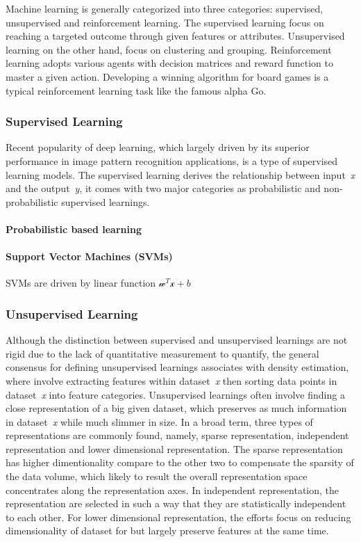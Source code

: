 Machine learning is generally categorized into three categories: supervised, unsupervised and reinforcement learning. The supervised learning focus on reaching a targeted outcome through given features or attributes. Unsupervised learning on the other hand, focus on clustering and grouping. Reinforcement learning adopts various agents with decision matrices and reward function to master a given action. Developing a winning algorithm for board games is a typical reinforcement learning task like the famous alpha Go.
\par

\subsubsection{Supervised Learning}

Recent popularity of deep learning, which largely driven by its superior performance in image pattern recognition applications, is a type of supervised learning models. The supervised learning  derives the relationship between input~\textit{x} and the output~\textit{y}, it comes with two major categories as probabilistic and non-probabilistic supervised learnings. 

\paragraph{Probabilistic based learning}
\paragraph{Support Vector Machines (SVMs)}
SVMs are driven by linear function $\mathcal{w}^T\mathcal{x}+b$ 

\subsubsection{Unsupervised Learning}
Although the distinction between supervised and unsupervised learnings are not rigid due to the lack of quantitative measurement to quantify, the general consensus for defining unsupervised learnings associates with density estimation, where involve extracting features within dataset~\textit{x} then sorting data points in dataset~\textit{x} into feature categories.
Unsupervised learnings often involve finding a close representation of a big given  dataset, which preserves as much information in dataset~\textit{x} while much slimmer in size. In a broad term, three types of representations are commonly found, namely, sparse representation, independent representation and lower dimensional representation. The sparse representation~\cite{Barlow_1989,Olshausen_1996,Hinton_1997} has higher dimentionality compare to the other two to compensate the sparsity of the data volume, which likely to result the overall representation space concentrates along the representation axes. In independent representation, the representation are selected in such a way that they are statistically independent to each other. For lower dimensional representation, the efforts focus on reducing dimensionality of dataset for but largely preserve features at the same time. 


